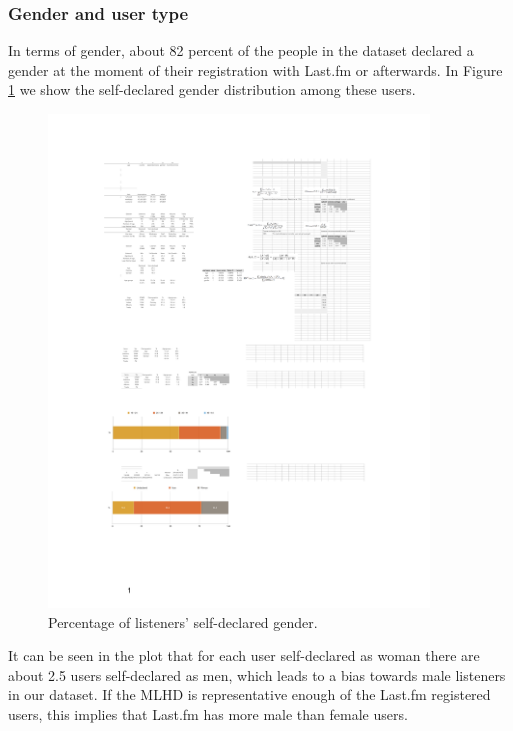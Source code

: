 \subsubsection{Gender and user type}
In terms of gender, about 82 percent of the people in the dataset declared a gender at the moment of their registration with Last.fm or afterwards. In Figure \ref{fig:gender_declared_cropped} we show the self-declared gender distribution among these users.

\begin{figure}[!h]
\centering
\includegraphics[width=0.9\textwidth]{gender_declared_cropped.pdf}				
\caption{Percentage of listeners' self-declared gender.}
\label{fig:gender_declared_cropped}
\end{figure}


It can be seen in the plot that for each user self-declared as woman there are about 2.5 users self-declared as men, which leads to a bias towards male listeners in our dataset. If the MLHD is representative enough of the Last.fm registered users, this implies that Last.fm has more male than female users.

